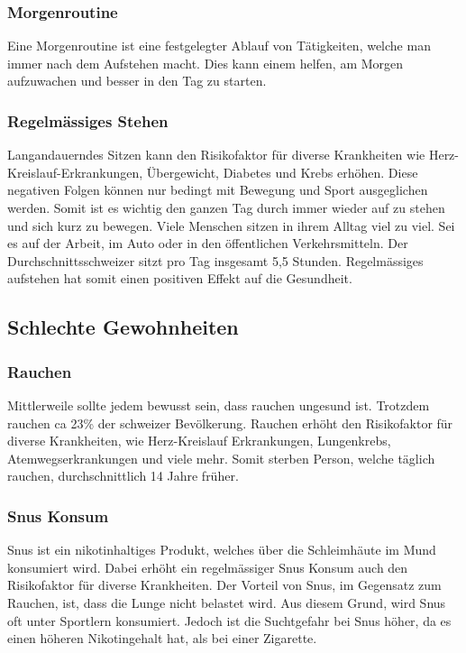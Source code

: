 \subsubsection{Morgenroutine}
Eine Morgenroutine ist eine festgelegter Ablauf von Tätigkeiten, welche man immer nach dem Aufstehen macht. Dies kann einem helfen, am Morgen aufzuwachen und besser in den Tag zu starten.
\subsubsection{Regelmässiges Stehen}
Langandauerndes Sitzen kann den Risikofaktor für diverse Krankheiten wie Herz- Kreislauf-Erkrankungen, Übergewicht, Diabetes und Krebs erhöhen. Diese negativen Folgen können nur bedingt mit Bewegung und Sport ausgeglichen werden. Somit ist es wichtig den ganzen Tag durch immer wieder auf zu stehen und sich kurz zu bewegen. \cite{bundesamtfrgesundheitbag_2020_aufstehen}
\newline
Viele Menschen sitzen in ihrem Alltag viel zu viel. Sei es auf der Arbeit, im Auto oder in den öffentlichen Verkehrsmitteln. Der Durchschnittsschweizer sitzt pro Tag insgesamt 5,5 Stunden.
\newline
Regelmässiges aufstehen hat somit einen positiven Effekt auf die Gesundheit.
\subsection{Schlechte Gewohnheiten}
\subsubsection{Rauchen}
Mittlerweile sollte jedem bewusst sein, dass rauchen ungesund ist. Trotzdem rauchen ca 23\% der schweizer Bevölkerung.
\newline
Rauchen erhöht den Risikofaktor für diverse Krankheiten, wie Herz-Kreislauf Erkrankungen, Lungenkrebs, Atemwegserkrankungen und viele mehr. Somit sterben Person, welche täglich rauchen, durchschnittlich 14 Jahre früher. \cite{bundesamtfrgesundheitbag_2015_tabak}
\subsubsection{Snus Konsum}
Snus ist ein nikotinhaltiges Produkt, welches über die Schleimhäute im Mund konsumiert wird. Dabei erhöht ein regelmässiger Snus Konsum auch den Risikofaktor für diverse Krankheiten.
\newline
Der Vorteil von Snus, im Gegensatz zum Rauchen, ist, dass die Lunge nicht belastet wird. Aus diesem Grund, wird Snus oft unter Sportlern konsumiert. Jedoch ist die Suchtgefahr bei Snus höher, da es einen höheren Nikotingehalt hat, als bei einer Zigarette.
